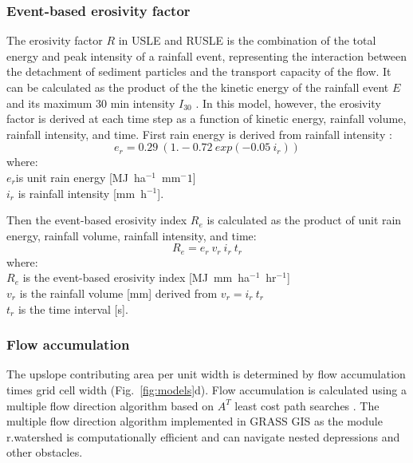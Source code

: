 \documentclass[gmd, manuscript]{copernicus}
\begin{document}
\subsubsection{Event-based erosivity factor}

The erosivity factor $R$ 
in USLE and RUSLE 
is the combination of the total energy 
and peak intensity of a rainfall event,
representing the interaction 
between the detachment of sediment particles
and the transport capacity of the flow. 
It can be calculated as the product of the 
the kinetic energy of the rainfall event $E$
and its maximum 30 \unit{min} intensity $I_{30}$
\citep{Brown1987,Renard1997}.
In this model, however, the erosivity factor
is derived at each time step as a function of
kinetic energy, rainfall volume, rainfall intensity, and time.
First rain energy is derived from rainfall intensity \citep{Brown1987}:
%
\begin{equation}
\label{eq:rain_energy}
{e_r = 0.29 ~ (1.-0.72 ~ exp(-0.05 ~ i_r))}
\end{equation}
%
{\small
\noindent
where: \\
\noindent
\hspace*{0.5em} $e_r$is unit rain energy [\unit{MJ~ha}$^{-1}$~\unit{mm}${^-1}$]\\
\hspace*{0.5em} $i_r$ is rainfall intensity [\unit{mm~h}$^{-1}$].\\
}

\noindent
Then the event-based erosivity index $R_e$ 
is calculated as the product of 
unit rain energy, rainfall volume, rainfall intensity, and time: 
\begin{equation}
\label{eq:erosivity_index}
{R_e = e_r ~ v_r ~ i_r ~ t_r}
\end{equation}
%
{\small
\noindent
where: \\
\hspace*{0.5em} $R_e$ is the event-based erosivity index [\unit{MJ~mm~ha}$^{-1}$~\unit{hr}$^{-1}$]\\
\hspace*{0.5em} $v_r$ is the rainfall volume [\unit{mm}] derived from ${v_r = i_r~t_r}$\\
\hspace*{0.5em} $t_r$ is the time interval [\unit{s}].
}


\subsubsection{Flow accumulation}
%
The upslope contributing area per unit width 
is determined by flow accumulation times grid cell width
(Fig.~\ref{fig:models}d). 
Flow accumulation is calculated using 
a multiple flow direction algorithm \citep{Metz2009} 
based on $A^{T}$ least cost path searches \citep{Ehlschlaeger1989}. 
The multiple flow direction algorithm 
implemented in GRASS GIS as the module r.watershed
is computationally efficient and can
navigate nested depressions and other obstacles. 
\end{document}
